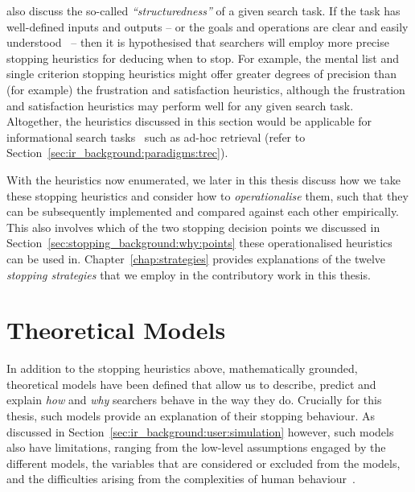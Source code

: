 
\cite{browne2005stopping_rules} also discuss the so-called \emph{``structuredness''} of a given search task. If the task has well-defined inputs and outputs -- or the goals and operations are clear and easily understood~\citep{simon1996sciences} -- then it is hypothesised that searchers will employ more precise stopping heuristics for deducing when to stop. For example, the mental list and single criterion stopping heuristics might offer greater degrees of precision than (for example) the frustration and satisfaction heuristics, although the frustration and satisfaction heuristics may perform well for any given search task. Altogether, the heuristics discussed in this section would be applicable for informational search tasks~\citep{browne2005stopping_rules} such as ad-hoc retrieval (refer to Section~\ref{sec:ir_background:paradigms:trec}).

With the heuristics now enumerated, we later in this thesis discuss how we take these stopping heuristics and consider how to \emph{operationalise} them, such that they can be subsequently implemented and compared against each other empirically. This also involves which of the two stopping decision points we discussed in Section~\ref{sec:stopping_background:why:points} these operationalised heuristics can be used in. Chapter~\ref{chap:strategies} provides explanations of the twelve \emph{stopping strategies} that we employ in the contributory work in this thesis.

\section{Theoretical Models}\label{sec:stopping_background:theoretical}
In addition to the stopping heuristics above, mathematically grounded, theoretical models have been defined that allow us to describe, predict and explain \emph{how} and \emph{why} searchers behave in the way they do. Crucially for this thesis, such models provide an explanation of their stopping behaviour. As discussed in Section~\ref{sec:ir_background:user:simulation} however, such models also have limitations, ranging from the low-level assumptions engaged by the different models, the variables that are considered or excluded from the models, and the difficulties arising from the complexities of human behaviour~\citep{fishwick1995simulation, azzopardi2015theories}.

